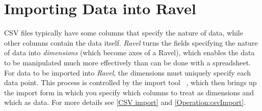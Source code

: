 \section{Importing Data into Ravel}

CSV files typically have some columns that specify the nature
of data, while other columns contain the data itself. \emph{Ravel}
turns the fields specifying the nature of data into \emph{dimensions}
(which become axes of a Ravel), which enables the data to be manipulated
much more effectively than can be done with a spreadsheet. For data
to be imported into \emph{Ravel}, the dimensions must uniquely specify
each data point. This process is controlled by the import tool
~, which then brings up the import
form in which you specify which columns to treat as dimensions and
which as data. For more details see \ref{CSV import} and \ref{Operation:csvImport}.

